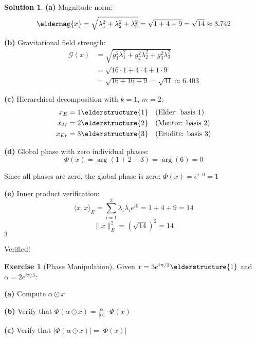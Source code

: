 \documentclass[12pt,a4paper]{article}
\newcommand{\checkmark}{\ding{51}}
\theoremstyle{definition}
\newtheorem{exercise}{Exercise}[section]
\newtheorem{solution}{Solution}[section]
\theoremstyle{remark}
\begin{document}
\begin{solution}
\textbf{(a)} Magnitude norm:
$$\eldermag{x} = \sqrt{\lambda_1^2 + \lambda_2^2 + \lambda_3^2} = \sqrt{1 + 4 + 9} = \sqrt{14} \approx 3.742$$

\textbf{(b)} Gravitational field strength:
\begin{align}
\mathcal{G}(x) &= \sqrt{g_1^2 \lambda_1^2 + g_2^2 \lambda_2^2 + g_3^2 \lambda_3^2} \\
&= \sqrt{16 \cdot 1 + 4 \cdot 4 + 1 \cdot 9} \\
&= \sqrt{16 + 16 + 9} = \sqrt{41} \approx 6.403
\end{align}

\textbf{(c)} Hierarchical decomposition with $k=1$, $m=2$:
\begin{align}
x_E &= 1\elderstructure{1} \quad \text{(Elder: basis 1)} \\
x_M &= 2\elderstructure{2} \quad \text{(Mentor: basis 2)} \\
x_{Er} &= 3\elderstructure{3} \quad \text{(Erudite: basis 3)}
\end{align}

\textbf{(d)} Global phase with zero individual phases:
$$\Phi(x) = \arg(1 + 2 + 3) = \arg(6) = 0$$

Since all phases are zero, the global phase is zero: $\Phi(x) = e^{i \cdot 0} = 1$

\textbf{(e)} Inner product verification:
$$\langle x, x \rangle_E = \sum_{i=1}^{3} \lambda_i \overline{\lambda_i} e^{i0} = 1 + 4 + 9 = 14$$
$$\|x\|_E^2 = (\sqrt{14})^2 = 14$$ $\checkmark$

Verified!
\end{solution}

\begin{exercise}[Phase Manipulation]
Given $x = 3e^{i\pi/2} \elderstructure{1}$ and $\alpha = 2e^{i\pi/3}$:

\textbf{(a)} Compute $\alpha \odot x$

\textbf{(b)} Verify that $\Phi(\alpha \odot x) = \frac{\alpha}{|\alpha|} \cdot \Phi(x)$

\textbf{(c)} Verify that $|\Phi(\alpha \odot x)| = |\Phi(x)|$
\end{exercise}
\end{document}
